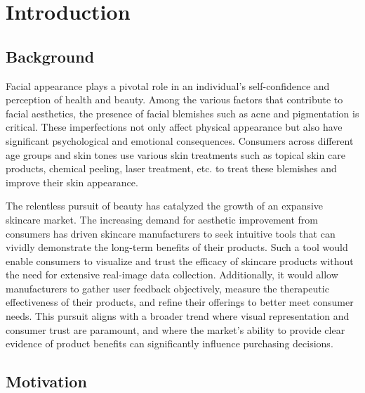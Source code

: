 
\chapter{Introduction}
\begin{spacing}{1.5}
\setlength{\parskip}{0.3in}

\section{Background}

Facial appearance plays a pivotal role in an individual's self-confidence and perception of health and beauty. Among the various factors that contribute to facial aesthetics, the presence of facial blemishes such as acne and pigmentation is critical. These imperfections not only affect physical appearance but also have significant psychological and emotional consequences. Consumers across different age groups and skin tones use various skin treatments such as topical skin care products, chemical peeling, laser treatment, etc. to treat these blemishes and improve their skin appearance.

The relentless pursuit of beauty has catalyzed the growth of an expansive skincare market. The increasing demand for aesthetic improvement from consumers has driven skincare manufacturers to seek intuitive tools that can vividly demonstrate the long-term benefits of their products. Such a tool would enable consumers to visualize and trust the efficacy of skincare products without the need for extensive real-image data collection. Additionally, it would allow manufacturers to gather user feedback objectively, measure the therapeutic effectiveness of their products, and refine their offerings to better meet consumer needs. This pursuit aligns with a broader trend where visual representation and consumer trust are paramount, and where the market's ability to provide clear evidence of product benefits can significantly influence purchasing decisions.

\section{Motivation}


\end{spacing}

